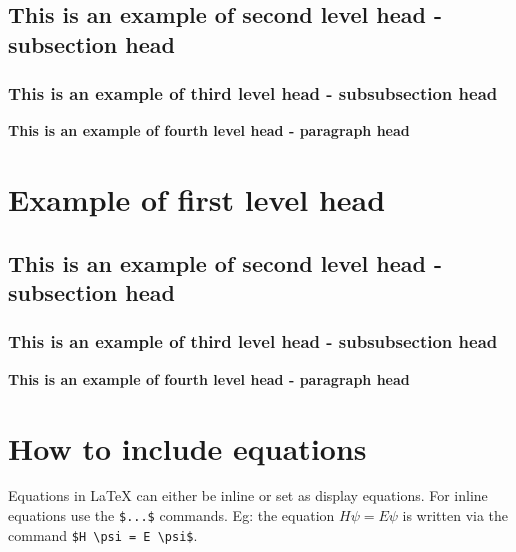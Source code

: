 \documentclass[12pt,a4paper]{article}
\newcommand{\subsubsubsection}[1]{%
  \vspace{\baselineskip}%
  \noindent\textbf{#1\\}\quad%
}
\begin{document}
\subsection{This is an example of second level head - subsection head}\label{subsec1}
\lipsum[5]

\subsubsection{This is an example of third level head - subsubsection head}\label{subsubsec1}
\lipsum[6]

\subsubsubsection{This is an example of fourth level head - paragraph head}
\lipsum[7]


\section{Example of first level head}\label{sec3}

\subsection{This is an example of second level head - subsection head}\label{subsec2}

\subsubsection{This is an example of third level head - subsubsection head}\label{subsubsec2}
\lipsum[8]

\subsubsubsection{This is an example of fourth level head - paragraph head}
\lipsum[9]


\section{How to include equations}\label{sec4}

Equations in \LaTeX{} can either be inline or set as display equations. For
inline equations use the \verb+$...$+ commands. Eg: the equation
$H\psi = E \psi$ is written via the command \verb+$H \psi = E \psi$+.
\end{document}
